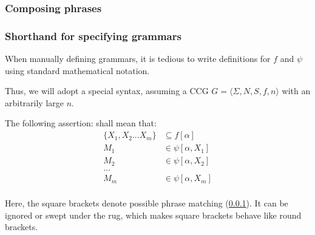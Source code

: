 \documentclass[main.tex]{subfiles}
\begin{document}
\subsubsection{Composing phrases}
\label{hack:phrases}

\subsubsection{Shorthand for specifying grammars}
\label{shorthand}
When manually defining grammars, it is tedious to write definitions
for $f$ and $\psi$ using standard mathematical notation.

Thus, we will adopt a special syntax, assuming a CCG
$G = \langle \Sigma, N, S, f, n \rangle$ with an arbitrarily large $n$.

The following assertion:
shall mean that:
\begin{align*}
    \{ X_1, X_2 ... X_m \} & \subseteq f[\alpha] \\
    M_1 & \in \psi[\alpha, X_1] \\
    M_2 & \in \psi[\alpha, X_2] \\
    ... & \\
    M_m & \in \psi[\alpha, X_m] \\
\end{align*}

Here, the square brackets denote possible phrase matching (\cref{hack:phrases}). It can
be ignored or swept under the rug, which makes square brackets behave like
round brackets.
\end{document}
